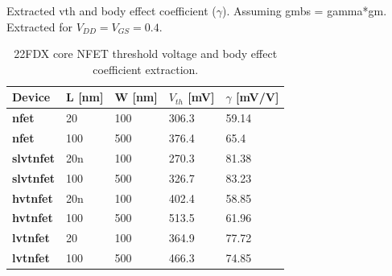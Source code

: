 		Extracted vth and body effect coefficient ($\gamma$). Assuming gmbs = gamma*gm. Extracted for $V_{DD}=V_{GS}=0.4$. 

			\begin{table}[htb!]
				\centering
				\def\arraystretch{1.5}		
				\setlength\arrayrulewidth{1pt}
				\setlength{\tabcolsep}{1em} %
				\fontfamily{\sfdefault}\selectfont 
				\begin{tabular}{|l|l|l|l|l|}	
					\hline 
					\rule[-1ex]{0pt}{2.5ex} \cellcolor{gray!40}\textbf{Device} & \cellcolor{gray!40}\textbf{L [nm]} & \cellcolor{gray!40}\textbf{W [nm]} & \cellcolor{gray!40}\textbf{$V_{th}$ [mV]} & \cellcolor{gray!40}\textbf{$\gamma$ [mV/V]}\\ 
					\hline 
					\rule[-1ex]{0pt}{2.5ex} \textbf{nfet} & 20 & 100 & 306.3 & 59.14 \\ 
					\hline 
					\rule[-1ex]{0pt}{2.5ex} \textbf{nfet} & 100 & 500 & 376.4 & 65.4 \\ 
					\hline 
					\rule[-1ex]{0pt}{2.5ex} \textbf{slvtnfet} & 20n & 100 & 270.3 & 81.38 \\ 
					\hline 
					\rule[-1ex]{0pt}{2.5ex} \textbf{slvtnfet} & 100 & 500 & 326.7 & 83.23 \\ 
					\hline 
					\rule[-1ex]{0pt}{2.5ex} \textbf{hvtnfet} & 20n & 100 & 402.4 & 58.85 \\ 
					\hline 
					\rule[-1ex]{0pt}{2.5ex} \textbf{hvtnfet} & 100 & 500 & 513.5 & 61.96 \\ 
					\hline 
					\rule[-1ex]{0pt}{2.5ex} \textbf{lvtnfet} & 20 & 100 & 364.9 & 77.72 \\ 
					\hline 
					\rule[-1ex]{0pt}{2.5ex} \textbf{lvtnfet} & 100 & 500 & 466.3 & 74.85 \\ 
					\hline 
				\end{tabular} 
				\caption{22FDX core NFET threshold voltage and body effect coefficient extraction.}
				\label{nfet_vth_gamma}
			\end{table} 

